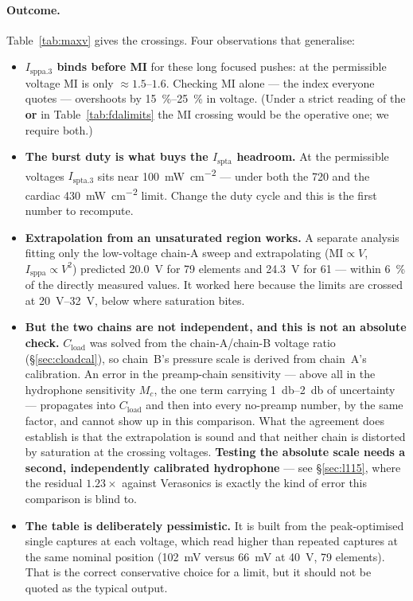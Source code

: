 \documentclass[11pt,a4paper]{article}
\newcommand{\good}[1]{\textcolor{green!45!black}{\textbf{#1}}}
\newcommand{\caveat}[1]{\textcolor{orange!75!black}{\textbf{#1}}}
\begin{document}
\paragraph{Outcome.} Table~\ref{tab:maxv} gives the crossings. Four observations that generalise:
\begin{itemize}
  \item \good{$I_\mathrm{sppa.3}$ binds before MI} for these long focused pushes: at the permissible
    voltage MI is only $\approx1.5$--$1.6$. Checking MI alone --- the index everyone quotes ---
    overshoots by \SIrange{15}{25}{\percent} in voltage. (Under a strict reading of the \textbf{or}
    in Table~\ref{tab:fdalimits} the MI crossing would be the operative one; we require both.)
  \item \good{The burst duty is what buys the $I_\mathrm{spta}$ headroom.} At the permissible
    voltages $I_\mathrm{spta.3}$ sits near \SI{100}{\milli\watt\per\square\centi\metre} --- under
    both the \SI{720}{} and the cardiac \SI{430}{\milli\watt\per\square\centi\metre} limit. Change
    the duty cycle and this is the first number to recompute.
  \item \good{Extrapolation from an unsaturated region works.} A separate analysis fitting only
    the low-voltage chain-A sweep and extrapolating ($\mathrm{MI}\propto V$,
    $I_\mathrm{sppa}\propto V^2$) predicted \SI{20.0}{\volt} for 79 elements and \SI{24.3}{\volt} for
    61 --- within \SI{6}{\percent} of the directly measured values. It worked here because the limits
    are crossed at \SIrange{20}{32}{\volt}, below where saturation bites.
  \item \caveat{But the two chains are not independent, and this is not an absolute check.}
    $C_\mathrm{load}$ was solved from the chain-A/chain-B voltage ratio (\S\ref{sec:cloadcal}), so
    chain~B's pressure scale is derived from chain~A's calibration. An error in the preamp-chain
    sensitivity --- above all in the hydrophone sensitivity $M_c$, the one term carrying
    \SIrange{1}{2}{\decibel} of uncertainty --- propagates into $C_\mathrm{load}$ and then into
    every no-preamp number, by the same factor, and cannot show up in this comparison. What the
    agreement does establish is that the extrapolation is sound and that neither chain is distorted
    by saturation at the crossing voltages. \good{Testing the absolute scale needs a second,
    independently calibrated hydrophone} --- see \S\ref{sec:l115}, where the residual
    $1.23\times$ against Verasonics is exactly the kind of error this comparison is blind to.
  \item \caveat{The table is deliberately pessimistic.} It is built from the peak-optimised single
    captures at each voltage, which read higher than repeated captures at the same nominal position
    (\SI{102}{\milli\volt} versus \SI{66}{\milli\volt} at \SI{40}{\volt}, 79 elements). That is the
    correct conservative choice for a limit, but it should not be quoted as the typical output.
\end{itemize}
\end{document}
